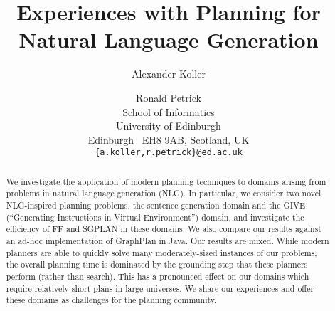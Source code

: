 \documentclass[letterpaper]{article}
\title{Experiences with Planning for Natural Language Generation}
\author{Alexander Koller \and Ronald Petrick \\
School of Informatics \\
University of Edinburgh \\
Edinburgh \ EH8 9AB, Scotland, UK \\
\texttt{\{a.koller,r.petrick\}@ed.ac.uk}}
\begin{document}
\maketitle


\begin{abstract}
We investigate the application of modern planning techniques to domains
arising from problems in natural language generation (NLG). In particular,
we consider two novel NLG-inspired planning problems, the sentence
generation domain and the GIVE (``Generating Instructions in Virtual
Environment'') domain, and investigate the efficiency of FF and SGPLAN in
these domains. We also compare our results against an ad-hoc implementation
of GraphPlan in Java. Our results are mixed. While modern planners are able
to quickly solve many moderately-sized instances of our problems, the
overall planning time is dominated by the grounding step that these
planners perform (rather than search). This has a pronounced effect on our
domains which require relatively short plans in large universes.  We share
our experiences and offer these domains as challenges for the planning
community.
\end{abstract}











\end{document}
